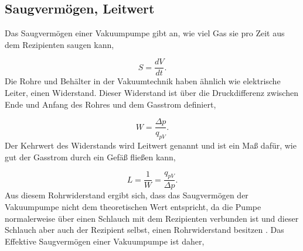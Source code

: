\subsection{Saugvermögen, Leitwert}
\label{sec:Saugvermögen}
Das Saugvermögen einer Vakuumpumpe gibt an, wie viel Gas sie pro Zeit aus dem Rezipienten saugen kann,

    \begin{equation}
    \label{equ:4}
        S = \frac{dV}{dt}.
    \end{equation}
Die Rohre und Behälter in der Vakuumtechnik haben ähnlich wie elektrische Leiter, einen Widerstand.
Dieser Widerstand ist über die Druckdifferenz zwischen Ende und Anfang des Rohres und dem Gasstrom definiert,

    \begin{equation}
    \label{equ:5}
        W = \frac{\Delta p}{q_{pV}}.
    \end{equation}
Der Kehrwert des Widerstands wird Leitwert genannt und ist ein Maß dafür, wie gut der Gasstrom durch ein Gefäß fließen kann,

    \begin{equation}
    \label{equ:6}
        L = \frac{1}{W} = \frac{q_{pV}}{\Delta p}.
    \end{equation}
Aus diesem Rohrwiderstand ergibt sich, dass das Saugvermögen der Vakuumpumpe nicht dem theoretischen Wert entspricht, 
da die Pumpe normalerweise über einen Schlauch mit dem Rezipienten verbunden ist und dieser Schlauch aber auch der Rezipient selbst, 
einen Rohrwiderstand besitzen \cite{Buch, S82}.
Das Effektive Saugvermögen einer Vakuumpumpe ist daher,

